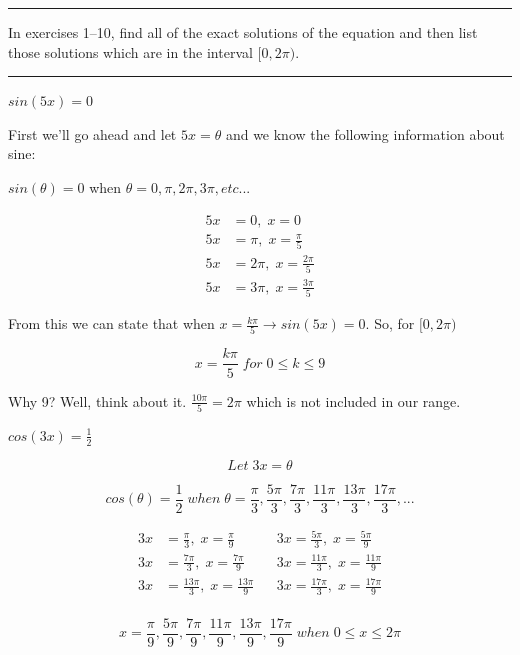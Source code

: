 \documentclass[10pt,letterpaper]{amspset}
\begin{document}

\hrule \medskip
In exercises 1--10, find all of the exact solutions of the equation and then list those solutions which are in the interval $[0, 2\pi)$. \medskip
\hrule

\begin{problem}[1]
    $sin(5x) = 0$
\end{problem}

\begin{solution}
    First we'll go ahead and let $5x = \theta$ and we know the following information about sine:
    
    $sin(\theta) = 0$ when $\theta = 0, \pi, 2\pi, 3\pi, etc...$
    
    \begin{align}
        5x &= 0, \; x = 0 \\
        5x &= \pi, \; x = \frac{\pi}{5} \\
        5x &= 2\pi, \; x = \frac{2\pi}{5} \\
        5x &= 3\pi, \; x = \frac{3\pi}{5}
    \end{align}
    
    From this we can state that when $x = \frac{k \pi}{5} \rightarrow sin(5x) = 0$. So, for $[0, 2\pi)$ 
    
    \[\boxed{ x = \frac{k\pi}{5} \; for \; 0 \leq k \leq 9 }\]
    
    Why 9? Well, think about it. $\frac{10\pi}{5} = 2\pi$ which is not included in our range.
\end{solution}


\pagebreak


\begin{problem}[2]
    $cos(3x) = \frac{1}{2}$
\end{problem}

\begin{solution}
    \[Let \; 3x = \theta\]
    
    \[cos(\theta) = \frac{1}{2} \; when \; \theta = \frac{\pi}{3}, \frac{5\pi}{3}, \frac{7\pi}{3}, \frac{11\pi}{3}, \frac{13\pi}{3}, \frac{17\pi}{3}, ...\]
    
    \begin{align}
        3x &= \frac{\pi}{3}, \; x = \frac{\pi}{9} && 3x = \frac{5\pi}{3}, \; x = \frac{5\pi}{9} \\[+3mm]
        3x &= \frac{7\pi}{3}, \; x = \frac{7\pi}{9} && 3x = \frac{11\pi}{3}, \; x = \frac{11\pi}{9}\\[+3mm]
        3x &= \frac{13\pi}{3}, \; x = \frac{13\pi}{9} && 3x = \frac{17\pi}{3}, \; x = \frac{17\pi}{9} \\
    \end{align}
    
    \[\boxed{  x = \frac{\pi}{9}, \frac{5\pi}{9}, \frac{7\pi}{9}, \frac{11\pi}{9}, \frac{13\pi}{9}, \frac{17\pi}{9} \; when \; 0 \leq x \leq 2\pi  }\]
\end{solution}
\end{document}
